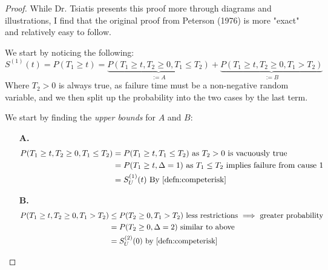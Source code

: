 \documentclass[10pt]{article}
\newcommand{\parenth}[1]{{\left(#1\right)}}
\begin{document}
\begin{proof}
    While Dr. Tsiatis presents this proof more through diagrams and illustrations, I find that the original proof from Peterson (1976) is more "exact" and relatively easy to follow.

    We start by noticing the following:
    $$S^\parenth{1}(t)=P(T_1 \geq t) = \underbrace{P(T_1\geq t, T_2 \geq 0, T_1 \leq T_2)}_{:=A} + \underbrace{P(T_1\geq t, T_2 \geq 0, T_1 > T_2)}_{:=B}$$
    Where $T_2 > 0$ is always true, as failure time must be a non-negative random variable, and we then split up the probability into the two cases by the last term.

    We start by finding the \textit{upper bounds} for $A$ and $B$:
    \begin{itemize}
        \item[\textbf{A.}] \begin{align*}
            P(T_1\geq t, T_2 \geq 0, T_1 \leq T_2) &= P(T_1 \geq t, T_1 \leq T_2)\text{ as $T_2>0$ is vacuously true}\\
            &= P(T_1 \geq t, \Delta = 1) \text{ as $T_1 \leq T_2$ implies failure from cause 1}\\
            &= S_U^\parenth{1}(t) \text{ By \cref{defn:competerisk}}
        \end{align*} 
        \item[\textbf{B.}] \begin{align*}
            P(T_1\geq t, T_2 \geq 0, T_1 > T_2) &\leq P(T_2 \geq 0, T_1 > T_2) \text{ less restrictions $\implies$ greater probability}\\
            &= P(T_2 \geq 0, \Delta = 2) \text{ similar to above}\\
            &= S_U^\parenth{2}(0) \text{ by \cref{defn:competerisk}}
        \end{align*}
    \end{itemize}


\end{proof}
\end{document}

